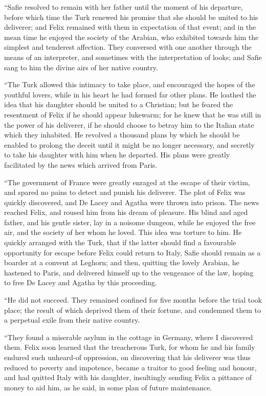 ``Safie resolved to remain with her
father until the moment of his departure,
before which time the Turk renewed
his promise that she should be
united to his deliverer; and Felix remained
with them in expectation of
that event; and in the mean time he
enjoyed the society of the Arabian, who
exhibited towards him the simplest and
tenderest affection. They conversed
with one another through the means of
an interpreter, and sometimes with the
interpretation of looks; and Safie sang to
him the divine airs of her native country.

``The Turk allowed this intimacy
to take place, and encouraged the hopes
of the youthful lovers, while in his
heart he had formed far other plans.
He loathed the idea that his daughter
should be united to a Christian; but he
feared the resentment of Felix if he
should appear lukewarm; for he knew
that he was still in the power of his
deliverer, if he should choose to betray
him to the Italian state which they inhabited.
He revolved a thousand plans
by which he should be enabled to prolong
the deceit until it might be no longer
necessary, and secretly to take his
daughter with him when he departed.
His plans were greatly facilitated by
the news which arrived from Paris.

``The government of France were
greatly enraged at the escape of their
victim, and spared no pains to detect
and punish his deliverer. The plot of
Felix was quickly discovered, and De
Lacey and Agatha were thrown into
prison. The news reached Felix, and
roused him from his dream of pleasure.
His blind and aged father, and his gentle
sister, lay in a noisome dungeon,
while he enjoyed the free air, and the
society of her whom he loved. This
idea was torture to him. He quickly
arranged with the Turk, that if the latter
should find a favourable opportunity
for escape before Felix could return
to Italy, Safie should remain as a
boarder at a convent at Leghorn; and
then, quitting the lovely Arabian, he
hastened to Paris, and delivered himself
up to the vengeance of the law,
hoping to free De Lacey and Agatha
by this proceeding.

``He did not succeed. They remained
confined for five months before
the trial took place; the result of which
deprived them of their fortune, and
condemned them to a perpetual exile
from their native country.

``They found a miserable asylum
in the cottage in Germany, where I
discovered them. Felix soon learned
that the treacherous Turk, for whom he
and his family endured such unheard-of
oppression, on discovering that his deliverer
was thus reduced to poverty and
impotence, became a traitor to good
feeling and honour, and had quitted
Italy with his daughter, insultingly
sending Felix a pittance of money to
aid him, as he said, in some plan of
future maintenance.

